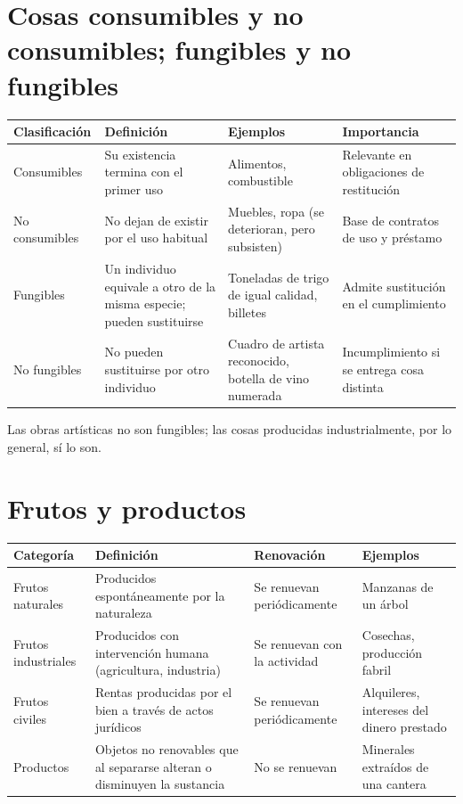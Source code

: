 \documentclass[12pt,oneside]{book}
\newenvironment{tabla}{%
    \par\medskip\begingroup\small\renewcommand{\arraystretch}{1.3}\noindent\ignorespaces
}{%
    \par\endgroup\medskip
}
\begin{document}
\section{Cosas consumibles y no consumibles; fungibles y no fungibles}

\begin{tabla}
\begin{tabularx}{\textwidth}{B{3.0cm}YYY}
\toprule
Clasificación & \textbf{Definición} & \textbf{Ejemplos} & \textbf{Importancia} \\
\midrule
Consumibles & Su existencia termina con el primer uso & Alimentos, combustible & Relevante en obligaciones de restitución \\
No consumibles & No dejan de existir por el uso habitual & Muebles, ropa (se deterioran, pero subsisten) & Base de contratos de uso y préstamo \\
Fungibles & Un individuo equivale a otro de la misma especie; pueden sustituirse & Toneladas de trigo de igual calidad, billetes & Admite sustitución en el cumplimiento \\
No fungibles & No pueden sustituirse por otro individuo & Cuadro de artista reconocido, botella de vino numerada & Incumplimiento si se entrega cosa distinta \\
\bottomrule
\end{tabularx}
\end{tabla}

Las obras artísticas no son fungibles; las cosas producidas industrialmente, por lo general, sí lo son.

\section{Frutos y productos}

\begin{tabla}
\begin{tabularx}{\textwidth}{B{3.2cm}YYY}
\toprule
Categoría & \textbf{Definición} & \textbf{Renovación} & \textbf{Ejemplos} \\
\midrule
Frutos naturales & Producidos espontáneamente por la naturaleza & Se renuevan periódicamente & Manzanas de un árbol \\
Frutos industriales & Producidos con intervención humana (agricultura, industria) & Se renuevan con la actividad & Cosechas, producción fabril \\
Frutos civiles & Rentas producidas por el bien a través de actos jurídicos & Se renuevan periódicamente & Alquileres, intereses del dinero prestado \\
Productos & Objetos no renovables que al separarse alteran o disminuyen la sustancia & No se renuevan & Minerales extraídos de una cantera \\
\bottomrule
\end{tabularx}
\end{tabla}
\end{document}
